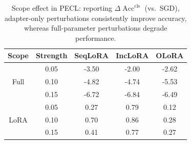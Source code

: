 \documentclass{article}
\theoremstyle{plain}
\theoremstyle{definition}
\theoremstyle{remark}
\begin{document}
{%
\setlength{\textfloatsep}{0pt}      %
\setlength{\intextsep}{1pt}         %
\setlength{\floatsep}{1pt}          %
\setlength{\abovecaptionskip}{2pt}  %
\setlength{\belowcaptionskip}{8pt}  %
\captionsetup{skip=4pt}           %
\begin{table}[t]
\vspace{-5pt}
\centering
\caption{Scope effect in PECL: reporting $\Delta\operatorname{Acc}^{\mathrm{cls}}$ (vs.\ SGD), adapter-only perturbations consistently improve accuracy, whereas full-parameter perturbations degrade performance.}
\label{tab:lora_or_full_cls—show}
\footnotesize
\setlength{\tabcolsep}{3pt}
\renewcommand{\arraystretch}{0.88}
\begin{tabular}{@{}c c c c c@{}}
\toprule
\textbf{Scope} & \textbf{Strength} & \textbf{SeqLoRA} & \textbf{IncLoRA} & \textbf{OLoRA} \\
\midrule
\multirow{3}{*}{Full}
 & 0.05 & -3.50 & -2.00 & -2.62 \\
 & 0.10 & -4.82 & -4.74 & -5.53 \\
 & 0.15 & -6.72 & -6.84 & -6.49 \\
\midrule
\multirow{3}{*}{LoRA}
 & 0.05 & 0.27 & 0.79 & 0.12 \\
 & 0.10 & 0.70 & 0.86 & 0.28 \\
 & 0.15 & 0.41 & 0.77 & 0.27 \\
\bottomrule
\end{tabular}
\end{table}
\vspace{-5pt}
}%
\end{document}
